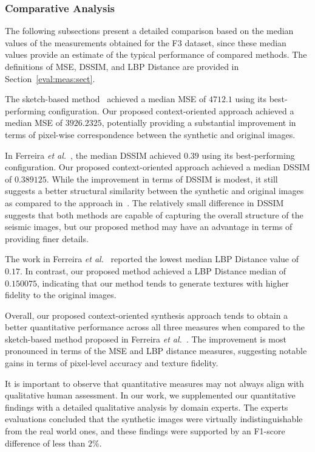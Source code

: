 \documentclass{ieeeaccess}
\begin{document}
\subsubsection{Comparative Analysis}

The following subsections present a detailed comparison based on the median values of the measurements obtained for the F3 dataset, since these median values provide an estimate of the typical performance of compared methods. The  definitions of MSE, DSSIM, and LBP Distance are provided in Section~\ref{eval:meas:sect}.

The sketch-based method~\cite{Ferreira2020} achieved a median MSE of $4712.1$ using its best-performing configuration. Our proposed context-oriented approach achieved a median MSE of $3926.2325$, potentially providing  a substantial improvement in terms of pixel-wise correspondence between the synthetic and original images.

In Ferreira \emph{et al.}~\cite{Ferreira2020}, the median DSSIM achieved $0.39$ using its best-performing configuration. Our proposed context-oriented approach achieved a median DSSIM of $0.389125$. While the improvement in terms of DSSIM is modest, it still suggests a better structural similarity between the synthetic and original images as compared to the approach in~\cite{Ferreira2020}. The relatively small difference in DSSIM suggests that both methods are capable of capturing the overall structure of the seismic images, but our proposed method may have an advantage in terms of providing finer details.

The work in Ferreira \emph{et al.}~\cite{Ferreira2020} reported the lowest median LBP Distance value of $0.17$. In contrast, our proposed method achieved a LBP Distance median of $0.150075$, indicating that our method tends to generate textures with higher fidelity to the original images.

Overall, our proposed context-oriented synthesis approach tends to obtain a better quantitative performance across all three measures when compared to the sketch-based method proposed in Ferreira \emph{et al.}~\cite{Ferreira2020}. The improvement is most pronounced in terms of the MSE and LBP distance measures, suggesting notable gains in terms of pixel-level accuracy and texture fidelity.

It is important to observe that quantitative measures may not always align with qualitative human assessment. In our work, we supplemented our quantitative findings with a detailed qualitative analysis by domain experts. The experts evaluations concluded that the synthetic images were virtually indistinguishable from the real world ones, and these findings were supported by an F1-score difference of less than $2$\%.
\end{document}
